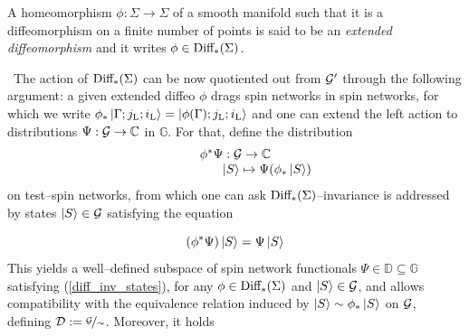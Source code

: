 \begin{defi}
    A homeomorphism $\phi:\Sigma\to\Sigma$ of a smooth manifold such that it is a diffeomorphism on a finite number of points is said to be an \emph{extended diffeomorphism} and it writes $\phi\in\text{\normalfont Diff}_*(\Sigma)$.
\end{defi}
\,\newline
The action of $\text{\normalfont Diff}_*(\Sigma)$ can be now quotiented out from ${\mathcal{G}'}$ through the following argument: a given extended diffeo $\phi$ drags spin networks in spin networks, for which we write $\phi_*\left| \Gamma;j_{\text{\normalfont L}};i_{\text{\normalfont L}} \right >=\left| \phi(\Gamma);j_{\text{\normalfont L}};i_{\text{\normalfont L}} \right >$ and one can extend the left action to distributions $\Psi:\mathcal{G}\to\mathbb{C}$ in $\mathbb{G}$. For that, define the distribution
$$\begin{matrix}
    \phi^*\Psi:\mathcal{G}\to\mathbb{C}\\
    \quad\qquad\qquad\left| S \right >\mapsto\Psi(\phi_*\left| S \right >)
\end{matrix}$$
on test--spin networks, from which one can ask $\text{\normalfont Diff}_*(\Sigma)$--invariance is addressed by states $\left| S \right >\in\mathcal{G}$ satisfying the equation

\begin{equation}\label{diff_inv_states}
 (\phi^*\Psi)\left| S \right >=\Psi\left| S \right >   
\end{equation}
This yields a well--defined subspace of spin network functionals $\Psi\in\mathbb{D}\subseteq\mathbb{G}$ satisfying (\ref{diff_inv_states}), for any $\phi\in\text{\normalfont Diff}_*(\Sigma)$ and $\left| S \right >\in\mathcal{G}$, and allows compatibility with the equivalence relation induced by $\left| S \right >\sim\phi_*\left| S \right >$ on $\mathcal{G}$, defining $\mathcal{D}:=\nicefrac{\mathcal{G}}{\sim}$. Moreover, it holds

